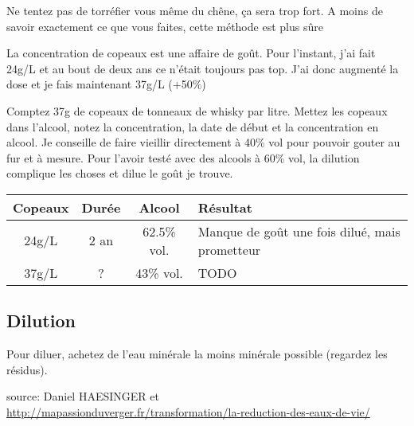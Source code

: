\documentclass[a4paper,twoside,openright]{report}
\begin{document}
\begin{remarque}
Ne tentez pas de torréfier vous même du chêne, ça sera trop fort. A moins de savoir exactement ce que vous faites, cette méthode est plus sûre
\end{remarque}

La concentration de copeaux est une affaire de goût. Pour l'instant, j'ai fait 24g/L et au bout de deux ans ce n'était toujours pas top. J'ai donc augmenté la dose et je fais maintenant 37g/L (+50\%)

\bigskip

Comptez 37g de copeaux de tonneaux de whisky par litre. 
Mettez les copeaux dans l'alcool, notez la concentration, la date de début et la concentration en alcool. Je conseille de faire vieillir directement à 40\% vol pour pouvoir gouter au fur et à mesure. Pour l'avoir testé avec des alcools à 60\% vol, la dilution complique les choses et dilue le goût je trouve. 


\begin{tabular}{|c|c|c|p{7cm}|}
\hline 
Copeaux & Durée & Alcool & Résultat \\ 
\hline 
24g/L & 2 an & 62.5\% vol. & Manque de goût une fois dilué, mais prometteur \\ 
\hline 
37g/L & ? & 43\% vol. & TODO \\ 
\hline 
\end{tabular} 

\subsection{Dilution}
Pour diluer, achetez de l'eau minérale la moins minérale possible (regardez les résidus). 

source: Daniel HAESINGER et \\
\url{http://mapassionduverger.fr/transformation/la-reduction-des-eaux-de-vie/}
\end{document}
